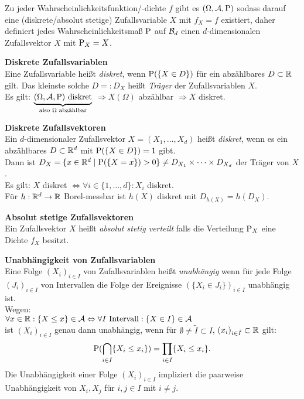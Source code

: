 Zu jeder Wahrscheinlichkeitsfunktion/-dichte $f$ gibt es $(\Omega,\A,\P)$ sodass
darauf eine (diskrete/absolut stetige) Zufallsvariable $X$ mit $f_X=f$ existiert,
daher definiert jedes Wahrscheinlichkeitsmaß $\P$ auf $\B{d}$ einen
$d$-dimensionalen Zufallsvektor $X$ mit $\P_X=X$.

\textbf{Diskrete Zufallsvariablen}\\
Eine Zufallsvariable heißt \textit{diskret}, wenn $\P(\{X\in D\})$ für ein abzählbares
$D\subset\R$ gilt. Das kleinste solche $D=:D_X$ heißt \textit{Träger} der
Zufallsvariablen $X$.\\
Es gilt: 
$\underbrace{(\Omega,\A,\P) \text{ diskret}}_{\text{also $\Omega$ abzählbar}}$
$\Rightarrow X(\Omega)$ abzählbar $\Rightarrow X$ diskret.

\textbf{Diskrete Zufallsvektoren}\\
Ein $d$-dimensionaler Zufallsvektor $X=(X_1,\ldots,X_d)$ heißt \textit{diskret},
wenn es ein abzählbares $D\subset\R^d$ mit $\P(\{X\in D\})=1$ gibt.\\
Dann ist $D_X=\{x\in\R^d\mid \P(\{X=x\})>0\}\neq D_{X_1}\times\cdots\times D_{X_d}$
der Träger von $X$.\\
Es gilt: $X$ diskret $\Leftrightarrow\forall i\in\{1,\ldots,d\}: X_i$ diskret.\\
Für $h:\R^d\to\R$ Borel-messbar ist $h(X)$ diskret mit $D_{h(X)}=h(D_X)$.

\textbf{Absolut stetige Zufallsvektoren}\\
Ein Zufallsvektor $X$ heißt \textit{absolut stetig verteilt} falls die Verteilung
$\P_X$ eine Dichte $f_X$ besitzt.

\textbf{Unabhängigkeit von Zufallsvariablen}\\
Eine Folge $(X_i)_{i\in I}$ von Zufallsvariablen heißt \textit{unabhängig} wenn für
jede Folge $(J_i)_{i\in I}$ von Intervallen die Folge der Ereignisse
$(\{X_i\in J_i\})_{i\in I}$ unabhängig ist.\\
Wegen:\\
$\forall x\in\R:\{X\leq x\}\in\A
\Leftrightarrow\forall I \text{ Intervall}:\{X\in I\}\in\A$\\ \newline
ist $(X_i)_{i\in I}$ genau dann unabhängig, wenn für 
$\emptyset\neq\tilde{I}\subset I$, $(x_i)_{i\in\tilde{I}}\subset\R$ gilt:
\[
	\P(\bigcap_{i\in\tilde{I}}\{X_i\leq x_i\})=\prod_{i\in\tilde{I}}\{X_i\leq x_i\}.
\]
Die Unabhängigkeit einer Folge $(X_i)_{i\in I}$ impliziert die paarweise
Unabhängigkeit von $X_i,X_j$ für $i,j\in I$ mit $i\neq j$.

